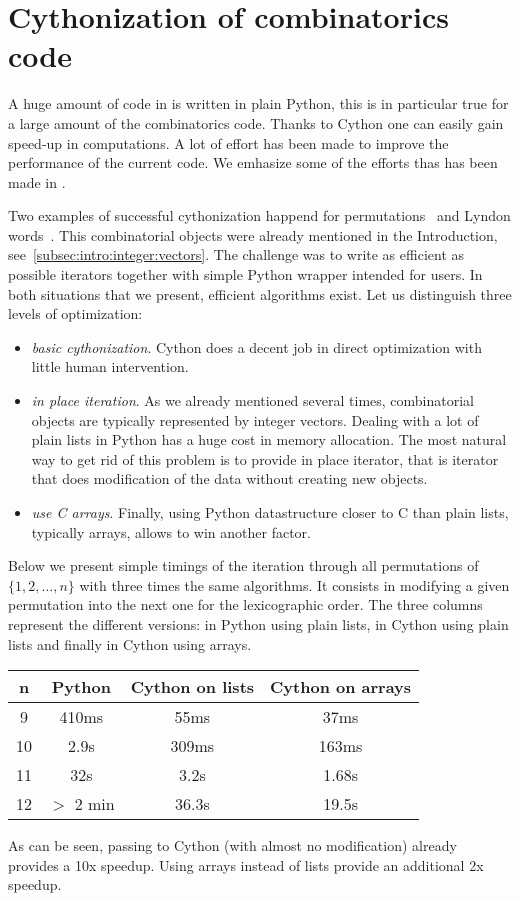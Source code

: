 \documentclass{deliverablereport}
\begin{document}

\section{Cythonization of combinatorics code}

A huge amount of code in \Sage is written in plain Python, this is in
particular true for a large amount of the combinatorics code. Thanks to
Cython one can easily gain speed-up in computations. A lot of effort has
been made to improve the performance of the current code. We emhasize
some of the efforts thas has been made in \ODK.

Two examples of successful cythonization happend for
permutations~\cite{trac-23734} and Lyndon words~\cite{trac-26111}.
This combinatorial objects were already mentioned in the
Introduction, see~\ref{subsec:intro:integer:vectors}.
The challenge was to write as efficient as possible iterators
together with simple Python wrapper intended for \Sage users.
In both situations that we present, efficient algorithms exist.
Let us distinguish three levels of optimization:
\begin{itemize}
\item \textit{basic cythonization}. Cython does a decent job in
direct optimization with little human intervention. 
\item \textit{in place iteration}. As we already mentioned several
times, combinatorial objects are typically represented by
integer vectors. Dealing with a lot of plain lists in Python has a huge
cost in memory allocation. The most natural way to get rid of
this problem is to provide in place iterator, that is iterator that does
modification of the data without creating new objects.
\item \textit{use C arrays}. Finally, using Python datastructure closer to C
than plain lists, typically arrays, allows to win another factor.
\end{itemize}
Below we present simple timings of the iteration through all permutations
of $\{1, 2, \ldots, n\}$ with three times the same algorithms. It consists
in modifying a given permutation into the next one for the lexicographic
order. The three columns represent the different versions: in Python
using plain lists, in Cython using plain lists and finally in Cython
using arrays.
\begin{center}\begin{tabular}{c|c|c|c}
n & Python & Cython on lists & Cython on arrays \\
\hline
9  & 410ms   & 55ms  & 37ms \\
10 & 2.9s    & 309ms & 163ms \\
11 & 32s     & 3.2s  & 1.68s \\
12 & $>$ 2 min & 36.3s & 19.5s \\
\end{tabular}\end{center}
As can be seen, passing to Cython (with almost no modification) already
provides a 10x speedup. Using arrays instead of lists provide an
additional 2x speedup.
\end{document}
